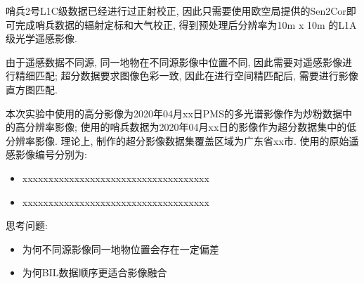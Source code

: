 哨兵2号L1C级数据已经进行过正射校正, 因此只需要使用欧空局提供的Sen2Cor即可完成哨兵数据的辐射定标和大气校正, 得到预处理后分辨率为10m x 10m 的L1A级光学遥感影像. 

由于遥感数据不同源, 同一地物在不同源影像中位置不同,  因此需要对遥感影像进行精细匹配; 超分数据要求图像色彩一致, 因此在进行空间精匹配后, 需要进行影像直方图匹配. 

本次实验中使用的高分影像为2020年04月xx日PMS的多光谱影像作为炒粉数据中的高分辨率影像; 使用的哨兵数据为2020年04月xx日的影像作为超分数据集中的低分辨率影像. 理论上, 制作的超分影像数据集覆盖区域为广东省xx市. 使用的原始遥感影像编号分别为:
\begin{itemize}
    \item xxxxxxxxxxxxxxxxxxxxxxxxxxxxxxxxxxxx
    \item xxxxxxxxxxxxxxxxxxxxxxxxxxxxxxxxxxxx
\end{itemize}

思考问题:
\begin{itemize}
    \item 为何不同源影像同一地物位置会存在一定偏差
    \item 为何BIL数据顺序更适合影像融合
\end{itemize}

